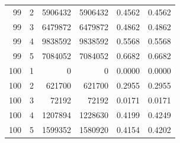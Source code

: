 \begin{longtable}{rrrrrr}
99 & 2 & 5906432 & 5906432 & 0.4562 & 0.4562 \\
99 & 3 & 6479872 & 6479872 & 0.4862 & 0.4862 \\
99 & 4 & 9838592 & 9838592 & 0.5568 & 0.5568 \\
99 & 5 & 7084052 & 7084052 & 0.6682 & 0.6682 \\
100 & 1 & 0 & 0 & 0.0000 & 0.0000 \\
100 & 2 & 621700 & 621700 & 0.2955 & 0.2955 \\
100 & 3 & 72192 & 72192 & 0.0171 & 0.0171 \\
100 & 4 & 1207894 & 1228630 & 0.4199 & 0.4249 \\
100 & 5 & 1599352 & 1580920 & 0.4154 & 0.4202 \\
\bottomrule
\end{longtable}
